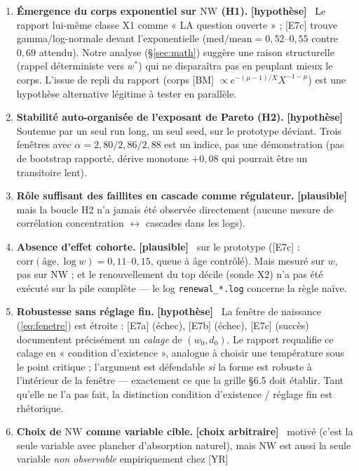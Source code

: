 \documentclass[11pt,a4paper]{article}
\newcommand{\NW}{\mathrm{NW}}
\newcommand{\plausible}[1]{\textbf{[plausible]}~#1}
\newcommand{\hypothese}[1]{\textbf{[hypothèse]}~#1}
\newcommand{\arbitraire}[1]{\textbf{[choix arbitraire]}~#1}
\begin{document}
\begin{enumerate}
\item \textbf{Émergence du corps exponentiel sur $\NW$ (H1).}
  \hypothese{} Le rapport lui-même classe X1 comme « LA question ouverte » ;
  [E7c] trouve gamma/log-normale devant l'exponentielle
  ($\mathrm{med}/\mathrm{mean} = 0{,}52$--$0{,}55$ contre $0{,}69$ attendu).
  Notre analyse (\S\ref{sec:math}) suggère une raison structurelle (rappel
  déterministe vers $w^*$) qui ne disparaîtra pas en peuplant mieux le corps.
  L'issue de repli du rapport (corps [BM] $\propto e^{-(\mu-1)/X} X^{-1-\mu}$)
  est une hypothèse alternative légitime à tester en parallèle.
\item \textbf{Stabilité auto-organisée de l'exposant de Pareto (H2).}
  \hypothese{} Soutenue par un seul run long, un seul seed, sur le prototype
  déviant. Trois fenêtres avec $\alpha = 2{,}80/2{,}86/2{,}88$ est un indice,
  pas une démonstration (pas de bootstrap rapporté, dérive monotone
  $+0{,}08$ qui pourrait être un transitoire lent).
\item \textbf{Rôle suffisant des faillites en cascade comme régulateur.}
  \plausible{} mais la boucle H2 n'a jamais été observée directement
  (aucune mesure de corrélation concentration $\leftrightarrow$ cascades dans
  les logs).
\item \textbf{Absence d'effet cohorte.} \plausible{} sur le prototype
  ([E7c] : $\mathrm{corr}(\text{âge}, \log w) = 0{,}11$--$0{,}15$, queue à âge
  contrôlé). Mais mesuré sur $w$, pas sur $\NW$ ; et le renouvellement du top
  décile (sonde X2) n'a pas été exécuté sur la pile complète — le log
  \texttt{renewal\_*.log} concerne la règle naïve.
\item \textbf{Robustesse sans réglage fin.} \hypothese{} La fenêtre de
  naissance (\ref{eq:fenetre}) est étroite : [E7a] (échec), [E7b] (échec),
  [E7c] (succès) documentent précisément un \emph{calage} de $(w_0, d_0)$.
  Le rapport requalifie ce calage en « condition d'existence », analogue à
  choisir une température sous le point critique ; l'argument est défendable
  \emph{si} la forme est robuste à l'intérieur de la fenêtre — exactement ce
  que la grille §6.5 doit établir. Tant qu'elle ne l'a pas fait, la
  distinction condition d'existence / réglage fin est rhétorique.
\item \textbf{Choix de $\NW$ comme variable cible.} \arbitraire{} motivé
  (c'est la seule variable avec plancher d'absorption naturel), mais $\NW$
  est aussi la seule variable \emph{non observable} empiriquement chez [YR]

\end{enumerate}
\end{document}
